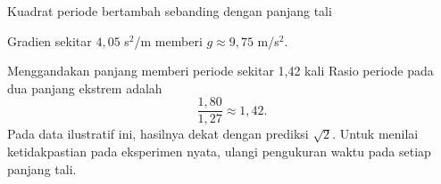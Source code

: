\documentclass[aspectratio=169,11pt]{beamer}
\begin{document}
\begin{frame}{Kuadrat periode bertambah sebanding dengan panjang tali}
  \centering
  \par Gradien sekitar $4{,}05$ s$^2$/m memberi $g\approx9{,}75$ m/s$^2$.
\end{frame}

\begin{frame}{Menggandakan panjang memberi periode sekitar 1,42 kali}
  Rasio periode pada dua panjang ekstrem adalah
  \[
    \frac{1{,}80}{1{,}27}\approx1{,}42.
  \]
  Pada data ilustratif ini, hasilnya dekat dengan prediksi $\sqrt{2}$.
  Untuk menilai ketidakpastian pada eksperimen nyata, ulangi pengukuran
  waktu pada setiap panjang tali.
\end{frame}
\end{document}
